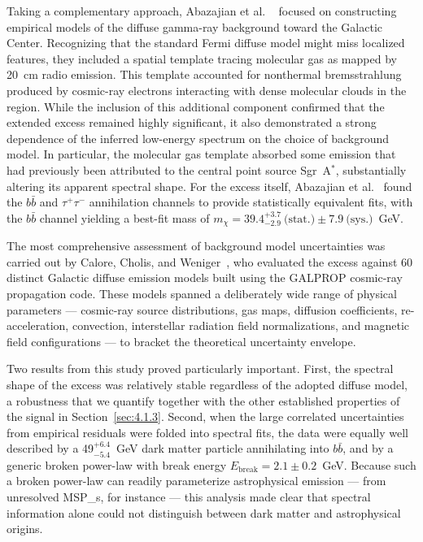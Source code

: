 Taking a complementary approach, Abazajian et al.
\ \cite{Abazajian:2014fta} focused on constructing empirical models of the diffuse gamma-ray background toward the Galactic Center.
Recognizing that the standard Fermi diffuse model might miss localized features, they included a spatial template tracing molecular gas as mapped by 20~cm radio emission.
This template accounted for nonthermal bremsstrahlung produced by cosmic-ray electrons interacting with dense molecular clouds in the region.
While the inclusion of this additional component confirmed that the extended excess remained highly significant, it also demonstrated a strong dependence of the inferred low-energy spectrum on the choice of background model.
In particular, the molecular gas template absorbed some emission that had previously been attributed to the central point source Sgr~A$^*$, substantially altering its apparent spectral shape.
For the excess itself, Abazajian et al.
\ found the $b\bar{b}$ and $\tau^+\tau^-$ annihilation channels to provide statistically equivalent fits, with the $b\bar{b}$ channel yielding a best-fit mass of $m_\chi = 39.4^{+3.7}_{-2.9}~\text{(stat.)} \pm 7.9~\text{(sys.)}$~GeV.

The most comprehensive assessment of background model uncertainties was carried out by Calore, Cholis, and Weniger~\cite{Calore:2014xka}, who evaluated the excess against 60 distinct Galactic diffuse emission models built using the GALPROP cosmic-ray propagation code.
These models spanned a deliberately wide range of physical parameters --- cosmic-ray source distributions, gas maps, diffusion coefficients, re-acceleration, convection, interstellar radiation field normalizations, and magnetic field configurations --- to bracket the theoretical uncertainty envelope.

Two results from this study proved particularly important.
First, the spectral shape of the excess was relatively stable regardless of the adopted diffuse model, a robustness that we quantify together with the other established properties of the signal in Section~\ref{sec:4.1.3}.
Second, when the large correlated uncertainties from empirical residuals were folded into spectral fits, the data were equally well described by a 49$^{+6.4}_{-5.4}$~GeV dark matter particle annihilating into $b\bar{b}$, and by a generic broken power-law with break energy $E_\text{break} = 2.1 \pm 0.2$~GeV.
Because such a broken power-law can readily parameterize astrophysical emission --- from unresolved \glspl{MSP_}, for instance --- this analysis made clear that spectral information alone could not distinguish between dark matter and astrophysical origins.

